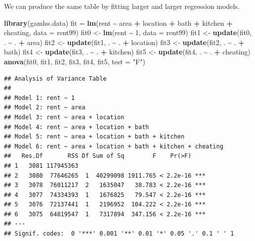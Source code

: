 \documentclass[
]{article}
\newenvironment{Shaded}{\begin{snugshade}}{\end{snugshade}}
\newcommand{\AttributeTok}[1]{\textcolor[rgb]{0.13,0.29,0.53}{#1}}
\newcommand{\DecValTok}[1]{\textcolor[rgb]{0.00,0.00,0.81}{#1}}
\newcommand{\FunctionTok}[1]{\textcolor[rgb]{0.13,0.29,0.53}{\textbf{#1}}}
\newcommand{\NormalTok}[1]{#1}
\newcommand{\OtherTok}[1]{\textcolor[rgb]{0.56,0.35,0.01}{#1}}
\newcommand{\SpecialCharTok}[1]{\textcolor[rgb]{0.81,0.36,0.00}{\textbf{#1}}}
\newcommand{\StringTok}[1]{\textcolor[rgb]{0.31,0.60,0.02}{#1}}
\begin{document}
We can produce the same table by fitting larger and larger regression
models.

\begin{Shaded}
\begin{Highlighting}[]
\FunctionTok{library}\NormalTok{(gamlss.data)}
\NormalTok{fit }\OtherTok{=} \FunctionTok{lm}\NormalTok{(rent }\SpecialCharTok{\textasciitilde{}}\NormalTok{ area }\SpecialCharTok{+}\NormalTok{ location }\SpecialCharTok{+}\NormalTok{ bath }\SpecialCharTok{+}\NormalTok{ kitchen }\SpecialCharTok{+}\NormalTok{ cheating, }\AttributeTok{data =}\NormalTok{ rent99)}
\NormalTok{fit0 }\OtherTok{\textless{}{-}} \FunctionTok{lm}\NormalTok{(rent }\SpecialCharTok{\textasciitilde{}} \DecValTok{1}\NormalTok{, }\AttributeTok{data =}\NormalTok{ rent99)}
\NormalTok{fit1 }\OtherTok{\textless{}{-}} \FunctionTok{update}\NormalTok{(fit0, . }\SpecialCharTok{\textasciitilde{}}\NormalTok{ . }\SpecialCharTok{+}\NormalTok{ area)}
\NormalTok{fit2 }\OtherTok{\textless{}{-}} \FunctionTok{update}\NormalTok{(fit1, . }\SpecialCharTok{\textasciitilde{}}\NormalTok{ . }\SpecialCharTok{+}\NormalTok{ location)}
\NormalTok{fit3 }\OtherTok{\textless{}{-}} \FunctionTok{update}\NormalTok{(fit2, . }\SpecialCharTok{\textasciitilde{}}\NormalTok{ . }\SpecialCharTok{+}\NormalTok{ bath)}
\NormalTok{fit4 }\OtherTok{\textless{}{-}} \FunctionTok{update}\NormalTok{(fit3, . }\SpecialCharTok{\textasciitilde{}}\NormalTok{ . }\SpecialCharTok{+}\NormalTok{ kitchen)}
\NormalTok{fit5 }\OtherTok{\textless{}{-}} \FunctionTok{update}\NormalTok{(fit4, . }\SpecialCharTok{\textasciitilde{}}\NormalTok{ . }\SpecialCharTok{+}\NormalTok{ cheating)}
\FunctionTok{anova}\NormalTok{(fit0, fit1, fit2, fit3, fit4, fit5, }\AttributeTok{test =} \StringTok{"F"}\NormalTok{)}
\end{Highlighting}
\end{Shaded}

\begin{verbatim}
## Analysis of Variance Table
## 
## Model 1: rent ~ 1
## Model 2: rent ~ area
## Model 3: rent ~ area + location
## Model 4: rent ~ area + location + bath
## Model 5: rent ~ area + location + bath + kitchen
## Model 6: rent ~ area + location + bath + kitchen + cheating
##   Res.Df       RSS Df Sum of Sq        F    Pr(>F)    
## 1   3081 117945363                                    
## 2   3080  77646265  1  40299098 1911.765 < 2.2e-16 ***
## 3   3078  76011217  2   1635047   38.783 < 2.2e-16 ***
## 4   3077  74334393  1   1676825   79.547 < 2.2e-16 ***
## 5   3076  72137441  1   2196952  104.222 < 2.2e-16 ***
## 6   3075  64819547  1   7317894  347.156 < 2.2e-16 ***
## ---
## Signif. codes:  0 '***' 0.001 '**' 0.01 '*' 0.05 '.' 0.1 ' ' 1
\end{verbatim}
\end{document}
